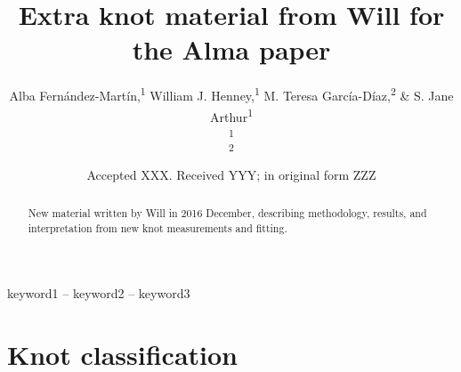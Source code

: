 \documentclass[usenatbib]{mnras}
\title[Will's extra material]{Extra knot material from Will for the
  Alma paper}
\author[Fernández-Martín et al.]{
  Alba Fernández-Martín,\textsuperscript{1}
  William J. Henney,\textsuperscript{1}
  M. Teresa García-Díaz,\textsuperscript{2}
  \& S. Jane Arthur\textsuperscript{1}\\
  \textsuperscript{1}\AddressIRyA\\
  \textsuperscript{2}\AddressEnsenada\\
}
\date{Accepted XXX. Received YYY; in original form ZZZ}
\begin{document}
\label{firstpage}
\pagerange{\pageref{firstpage}--\pageref{lastpage}}
\maketitle

\begin{abstract}
New material written by Will in 2016 December, describing methodology,
results, and interpretation from new knot measurements and fitting.
\end{abstract}

\begin{keywords}
keyword1 -- keyword2 -- keyword3
\end{keywords}

\section{Knot classification}
\label{sec:knot-classification}
\end{document}

